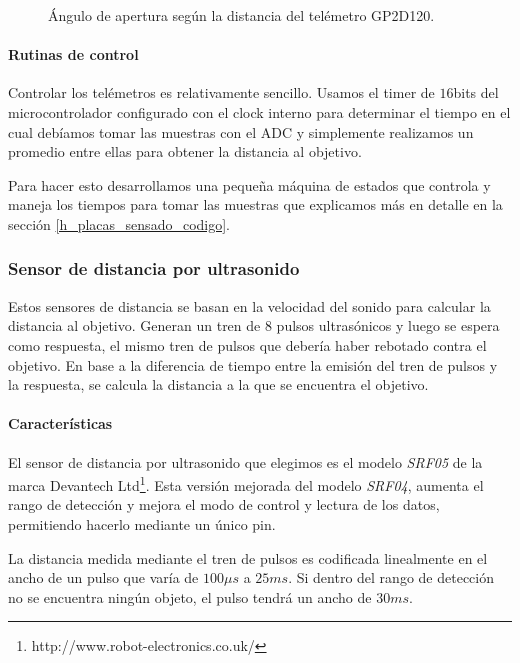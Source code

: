 \begin{figure}[h]
\begin{minipage}[b]{0.5\linewidth}
		\caption{\'Angulo de apertura seg\'un la distancia del tel\'emetro GP2D120.}
		\label{hF_gp2d120_apertura}
	\end{minipage}
\end{figure}

\paragraph{Rutinas de control}
\label{h_sensado_telemetros_rutinas}

Controlar los tel\'emetros es relativamente sencillo.
Usamos el timer de $16$bits del microcontrolador configurado con el clock interno para determinar el tiempo en el cual
deb\'iamos tomar las muestras con el ADC y simplemente realizamos un promedio entre ellas para obtener la distancia al objetivo.

Para hacer esto desarrollamos una peque\~na m\'aquina de estados que controla y maneja los tiempos para tomar las muestras que
explicamos m\'as en detalle en la secci\'on \ref{h_placas_sensado_codigo}.

\subsubsection{Sensor de distancia por ultrasonido}
\label{h_sensado_ultrasonido}

Estos sensores de distancia se basan en la velocidad del sonido para calcular la distancia al objetivo.
Generan un tren de $8$ pulsos ultras\'onicos y luego se espera como respuesta, el mismo tren de pulsos que deber\'ia haber rebotado contra el objetivo.
En base a la diferencia de tiempo entre la emisi\'on del tren de pulsos y la respuesta, se calcula la distancia a la que se encuentra el objetivo.

\paragraph{Caracter\'isticas}
\label{h_sensado_ultrasonido_caracteristicas}

El sensor de distancia por ultrasonido que elegimos es el modelo \emph{SRF05} de la marca Devantech Ltd\footnote{http://www.robot-electronics.co.uk/}.
Esta versi\'on mejorada del modelo \emph{SRF04}, aumenta el rango de detecci\'on y mejora el modo de control y lectura de los datos, permitiendo
hacerlo mediante un \'unico pin.

La distancia medida mediante el tren de pulsos es codificada linealmente en el ancho de un pulso que var\'ia de $100\mu s$ a $25 ms$.
Si dentro del rango de detecci\'on no se encuentra ning\'un objeto, el pulso tendr\'a un ancho de $30ms$.

